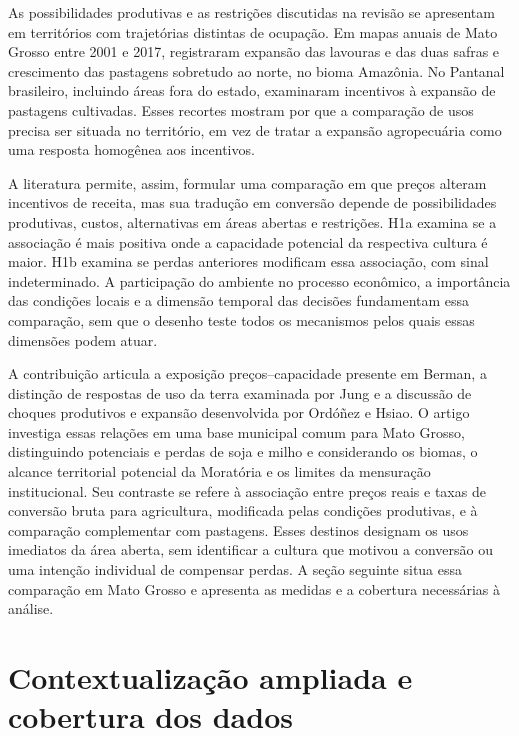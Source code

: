 As possibilidades produtivas e as restrições discutidas na revisão se apresentam em territórios com trajetórias distintas de ocupação. Em mapas anuais de Mato Grosso entre 2001 e 2017,  registraram expansão das lavouras e das duas safras e crescimento das pastagens sobretudo ao norte, no bioma Amazônia. No Pantanal brasileiro, incluindo áreas fora do estado,  examinaram incentivos à expansão de pastagens cultivadas. Esses recortes mostram por que a comparação de usos precisa ser situada no território, em vez de tratar a expansão agropecuária como uma resposta homogênea aos incentivos.

A literatura permite, assim, formular uma comparação em que preços alteram incentivos de receita, mas sua tradução em conversão depende de possibilidades produtivas, custos, alternativas em áreas abertas e restrições. H1a examina se a associação é mais positiva onde a capacidade potencial da respectiva cultura é maior. H1b examina se perdas anteriores modificam essa associação, com sinal indeterminado. A participação do ambiente no processo econômico, a importância das condições locais e a dimensão temporal das decisões fundamentam essa comparação, sem que o desenho teste todos os mecanismos pelos quais essas dimensões podem atuar.

A contribuição articula a exposição preços--capacidade presente em Berman, a distinção de respostas de uso da terra examinada por Jung e a discussão de choques produtivos e expansão desenvolvida por Ordóñez e Hsiao. O artigo investiga essas relações em uma base municipal comum para Mato Grosso, distinguindo potenciais e perdas de soja e milho e considerando os biomas, o alcance territorial potencial da Moratória e os limites da mensuração institucional. Seu contraste se refere à associação entre preços reais e taxas de conversão bruta para agricultura, modificada pelas condições produtivas, e à comparação complementar com pastagens. Esses destinos designam os usos imediatos da área aberta, sem identificar a cultura que motivou a conversão ou uma intenção individual de compensar perdas. A seção seguinte situa essa comparação em Mato Grosso e apresenta as medidas e a cobertura necessárias à análise.


\section{Contextualização ampliada e cobertura dos dados}
\label{text:s2}
\label{descritiva-dados}

